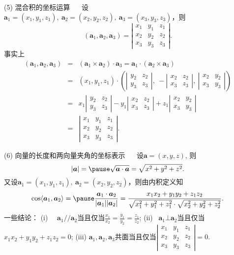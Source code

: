 \documentclass[compress,mathserif,cjk]{beamer}
\theoremstyle{remark}
\numberwithin{equation}{section}
\begin{document}
\begin{CJK}{UTF8}{gbsn}
\begin{frame}
 (5) 混合积的坐标运算
　\vskip 5pt
 设$\bm a_1=(x_1,y_1,z_1),~\bm a_2=(x_2,y_2,z_2),~\bm a_3=(x_3,y_3,z_3)$，则
 $$(\bm a_1,\bm a_2,\bm a_3)=\left|\begin{matrix}x_1&y_1&z_1\\x_2&y_2&z_2\\x_3&y_3&z_3\end{matrix}\right|.$$
  \pause 事实上
 \begin{eqnarray*}
  (\bm a_1,\bm a_2,\bm a_3)&=& (\bm a_1\times\bm a_2)\cdot\bm a_3=\bm a_1\cdot(\bm a_2\times\bm a_3) \\
  &=&(x_1,y_1,z_1)\cdot
  \left(\left|\begin{matrix}y_2&z_2\\y_3&z_3\end{matrix}\right|,~-\left|\begin{matrix}x_2&z_2\\x_3&z_3\end{matrix}\right|,~\left|\begin{matrix}x_2&y_2\\x_3&y_3\end{matrix}\right|\right)\\
  &=&x_1\left|\begin{matrix}y_2&z_2\\y_3&z_3\end{matrix}\right|-y_1\left|\begin{matrix}x_2&z_2\\x_3&z_3\end{matrix}\right|+z_1\left|\begin{matrix}x_2&y_2\\x_3&y_3\end{matrix}\right|\\
  &=&\left|\begin{matrix}x_1&y_1&z_1\\x_2&y_2&z_2\\x_3&y_3&z_3\end{matrix}\right|.
 \end{eqnarray*}
\end{frame}

\begin{frame}
 (6) 向量的长度和两向量夹角的坐标表示
　\vskip 5pt
 设$\bm a=(x,y,z)$, 则
 $$|\bm a|=\pause\sqrt{\bm a\cdot\bm a}=\sqrt{x^2+y^2+z^2}.$$
 \pause 又设$\bm a_1=(x_1,y_1,z_1),~\bm a_2=(x_2,y_2,z_2)$，则由内积定义知
 $$\cos\langle\bm a_1,\bm a_2\rangle=\pause \frac{\bm a_1\cdot\bm a_2}{|\bm a_1||\bm a_2|}=\frac{x_1x_2+y_1y_2+z_1z_2}{\sqrt{x_1^2+y_1^2+z_1^2}\cdot\sqrt{x_2^2+y_2^2+z_2^2}}.$$
 \pause 一些结论：
 \vskip 5pt
 (i) ~~$\bm a_1//\bm a_2$当且仅当$\frac{x_1}{x_2}=\frac{y_1}{y_2}=\frac{z_1}{z_2}$;
 \vskip 5pt
 (ii) ~$\bm a_1\bot\bm a_2$当且仅当$x_1x_2+y_1y_2+z_1z_2=0$;
 \vskip 5pt
 (iii) $\bm a_1,\bm a_2,\bm a_3$共面当且仅当$\left|\begin{matrix}x_1&y_1&z_1\\x_2&y_2&z_2\\x_3&y_3&z_3\end{matrix}\right|=0$.
\end{frame}


\end{CJK}
\end{document}

